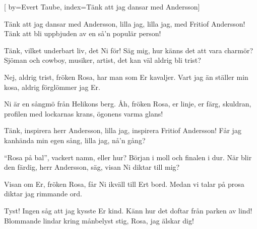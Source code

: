 


[ 	%
	by={Evert Taube},
	index={Tänk att jag dansar med Andersson}]	%
	
\beginverse*		%
Tänk att jag dansar med Andersson,
lilla jag, lilla jag,
med Fritiof Andersson!
Tänk att bli uppbjuden av en så'n
populär person!
\endverse			%

\beginverse*		%
Tänk, vilket underbart liv, det Ni för!
Säg mig, hur känns det att vara charmör?
Sjöman och cowboy, musiker, artist,
det kan väl aldrig bli trist?
\endverse			%

\beginverse*		%
Nej, aldrig trist, fröken Rosa,
har man som Er kavaljer.
Vart jag än ställer min kosa,
aldrig förglömmer jag Er.
\endverse			%

\beginverse*		%
Ni är en sångmö från Helikons berg.
Åh, fröken Rosa, er linje, er färg,
skuldran, profilen med lockarnas krans,
ögonens varma glans!
\endverse			%

\beginverse*		%
Tänk, inspirera herr Andersson,
lilla jag, inspirera Fritiof Andersson!
Får jag kanhända min egen sång,
lilla jag, nå'n gång?
\endverse			%

\beginverse*		%
``Rosa på bal'', vackert namn, eller hur?
Början i moll och finalen i dur.
När blir den färdig, herr Andersson, säg,
visan Ni diktar till mig?
\endverse			%

\beginverse*		%
Visan om Er, fröken Rosa,
får Ni ikväll till Ert bord.
Medan vi talar på prosa
diktar jag rimmande ord.
\endverse			%

\beginverse*		%
Tyst! Ingen såg att jag kysste Er kind.
Känn hur det doftar från parken av lind!
Blommande lindar kring månbelyst stig,
Rosa, jag älskar dig!
\endverse			%
\endsong			%
